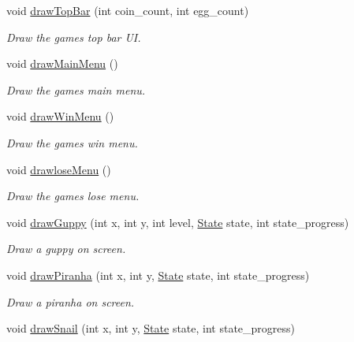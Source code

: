 \begin{DoxyCompactItemize}
void \mbox{\hyperlink{class_graphics_a91331c794ba21a860e8137b25df855dc}{draw\+Top\+Bar}} (int coin\+\_\+count, int egg\+\_\+count)
\begin{DoxyCompactList}\small\item\em Draw the game\textquotesingle{}s top bar UI. \end{DoxyCompactList}\item 
void \mbox{\hyperlink{class_graphics_ada6dbf202881bee3ed4bbe4ca31aecb6}{draw\+Main\+Menu}} ()
\begin{DoxyCompactList}\small\item\em Draw the game\textquotesingle{}s main menu. \end{DoxyCompactList}\item 
void \mbox{\hyperlink{class_graphics_ae8619c9c1de576df13861512024d7867}{draw\+Win\+Menu}} ()
\begin{DoxyCompactList}\small\item\em Draw the game\textquotesingle{}s win menu. \end{DoxyCompactList}\item 
void \mbox{\hyperlink{class_graphics_a88bb368ba8388bc9e072c7f48208edba}{drawlose\+Menu}} ()
\begin{DoxyCompactList}\small\item\em Draw the game\textquotesingle{}s lose menu. \end{DoxyCompactList}\item 
void \mbox{\hyperlink{class_graphics_a35aa55c180a9f9be306b74906f710954}{draw\+Guppy}} (int x, int y, int level, \mbox{\hyperlink{_constants_8hpp_a5d74787dedbc4e11c1ab15bf487e61f8}{State}} state, int state\+\_\+progress)
\begin{DoxyCompactList}\small\item\em Draw a guppy on screen. \end{DoxyCompactList}\item 
void \mbox{\hyperlink{class_graphics_a2b8425428b81e566f960928fa42133b6}{draw\+Piranha}} (int x, int y, \mbox{\hyperlink{_constants_8hpp_a5d74787dedbc4e11c1ab15bf487e61f8}{State}} state, int state\+\_\+progress)
\begin{DoxyCompactList}\small\item\em Draw a piranha on screen. \end{DoxyCompactList}\item 
void \mbox{\hyperlink{class_graphics_afce4453a05a511f4f07164d91c4ee2bf}{draw\+Snail}} (int x, int y, \mbox{\hyperlink{_constants_8hpp_a5d74787dedbc4e11c1ab15bf487e61f8}{State}} state, int state\+\_\+progress)

\end{DoxyCompactItemize}
